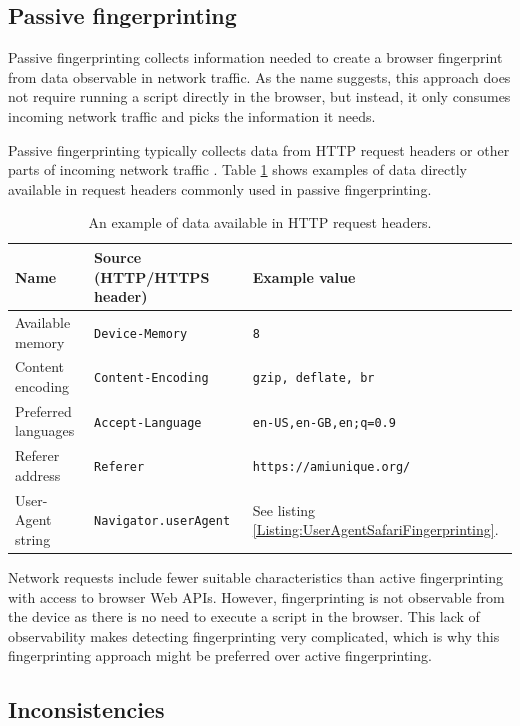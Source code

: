 \subsection{Passive fingerprinting}

Passive fingerprinting collects information needed to create a browser fingerprint from data observable in network traffic. As the name suggests, this approach does not require running a script directly in the browser, but instead, it only consumes incoming network traffic and picks the information it needs.

Passive fingerprinting typically collects data from HTTP request headers or other parts of incoming network traffic \cite{JShelterPaper}. Table \ref{Table:PassiveDataExamples} shows examples of data directly available in request headers commonly used in passive fingerprinting.

\begin{table}[H]
	\centering
	\begin{tabular}{lll}
		\toprule
		Name                & Source (HTTP/HTTPS header)   & Example value \\
		\midrule
		Available memory    & \texttt{Device-Memory}       & \verb|8| \\
		Content encoding    & \texttt{Content-Encoding}    & \verb|gzip, deflate, br| \\
		Preferred languages & \texttt{Accept-Language}     & \verb|en-US,en-GB,en;q=0.9| \\
		Referer address     & \texttt{Referer}             & \verb|https://amiunique.org/| \\
		User-Agent string   & \texttt{Navigator.userAgent} & See listing \ref{Listing:UserAgentSafariFingerprinting}. \\
		\bottomrule                               
	\end{tabular}
	
	\caption{An example of data available in HTTP request headers.}
	\label{Table:PassiveDataExamples}
\end{table}

Network requests include fewer suitable characteristics than active fingerprinting with access to browser Web APIs. However, fingerprinting is not observable from the device as there is no need to execute a script in the browser. This lack of observability makes detecting fingerprinting very complicated, which is why this fingerprinting approach might be preferred over active fingerprinting.

\subsection{Inconsistencies}

